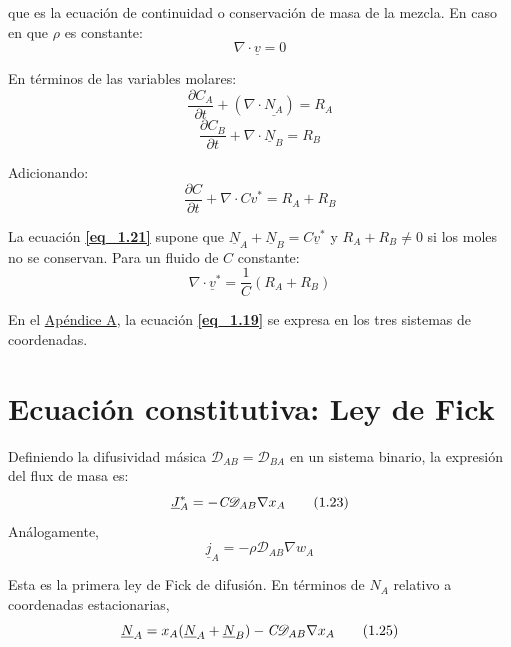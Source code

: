  que es la ecuación de continuidad o conservación de masa de la mezcla. En caso en que $\rho$ es constante:
 \begin{equation}
 	\nabla \cdot \underline{v} = 0 \tag{1.18}\label{eq_1.18}
 \end{equation}
 
 En términos de las variables molares:
 \begin{equation}
 	\frac{\partial C_A}{\partial t} + (\nabla \cdot \underline{N_A}) = R_A \tag{1.19} \label{eq_1.19}
 \end{equation}
 \begin{equation}
 	\frac{\partial C_B}{\partial t} + \nabla \cdot \underline{N}_B = R_B \tag{1.20} \label{eq_1.20}
 \end{equation}
 
 Adicionando:
 \begin{equation}
 	\frac{\partial C}{\partial t} + \nabla \cdot C {v}^* = R_A + R_B \tag{1.21} \label{eq_1.21}
 \end{equation}
 
 La ecuación \textbf{\eqref{eq_1.21}} supone que $\underline{N}_A +\underline{ N}_B = C \underline{v}^*$ y $R_A + R_B \neq 0$ si los moles no se conservan. Para un fluido de $C$ constante:
 \begin{equation}
 	\nabla \cdot \underline{v}^* = \frac{1}{C} (R_A + R_B) \tag{1.22}
    \label{eq_1.22}
 \end{equation}
 
 En el \underline{Apéndice A}, la ecuación \textbf{\eqref{eq_1.19}} se expresa en los tres sistemas de coordenadas.



 \section{Ecuación constitutiva: Ley de Fick}

Definiendo la difusividad másica $\mathscr{D}_{AB}=\mathscr{D}_{BA}$ en un sistema binario, la expresión del flux de masa es:
\begin{equation}
	\underline{J}_A^* = - \emph{C} \mathscr{D}_{AB} \nabla x_A  \tag{1.23}
    \label{eq_1.23}
\end{equation}
Análogamente,
\begin{equation}
	\underline{j}_A = - \rho \mathscr{D}_{AB} \nabla w_A  \tag{1.24}\label{eq_1.24}
\end{equation}

Esta es la primera ley de Fick de difusión. En términos de $N_A$ relativo a coordenadas estacionarias,
\begin{equation}
	\underline{N}_A = x_A (\underline{N}_A + \underline{N}_B) - \emph{C} \mathscr{D}_{AB} \nabla x_A  \tag{1.25}\label{eq_1.25}
\end{equation}


